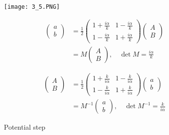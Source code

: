 \begin{figure}[ht]
    \begin{minipage}{0.5\textwidth}
        \centering
        \texttt{[image: 3\_5.PNG]}
        \caption{Potential step}
    \end{minipage}
    \begin{minipage}{0.5\textwidth}
        \begin{equation}
            \begin{aligned}
            \left(\begin{array}{cr}{a} 
            \\ {b}\end{array}\right) &=\frac{1}{2}\left(\begin{array}{cc}{1+\frac{i \alpha}{k}} & {1-\frac{i \alpha}{k}} 
            \\ {1-\frac{i \alpha}{k}} & {1+\frac{i \alpha}{k}}\end{array}\right)\left(\begin{array}{c}{A} 
            \\ {B}\end{array}\right) 
            \\ &=M\left(\begin{array}{cc}{A} 
            \\ {B}\end{array}\right), \quad \operatorname{det} M=\frac{i \alpha}{k} &
            \end{aligned}
            \end{equation}
            
            \begin{equation}
                \begin{aligned}
                \left(\begin{array}{cr}{A} 
                \\ {B}\end{array}\right) &=\frac{1}{2}\left(\begin{array}{cc}{1+\frac{k}{i \alpha}} & {1-\frac{k}{i \alpha}} 
                \\ {1-\frac{k}{i \alpha}} & {1+\frac{k}{i \alpha}}\end{array}\right)
                \left(\begin{array}{c}{a} 
                \\ {b}\end{array}\right) 
                \\ &=M^{-1}\left(\begin{array}{cc}{a} 
                \\ {b}\end{array}\right), \quad \operatorname{det} M^{-1}=\frac{k}{i \alpha} &
                \end{aligned}
                \end{equation}
    \end{minipage}

\end{figure}
